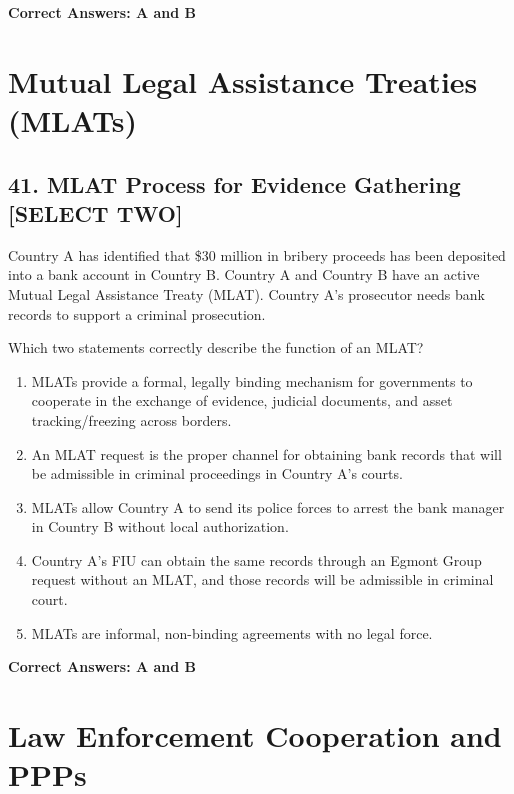\documentclass[11pt,a4paper]{article}
\begin{document}
	\textbf{Correct Answers: A and B}
	
	\section{Mutual Legal Assistance Treaties (MLATs)}
	
	\subsection{41. MLAT Process for Evidence Gathering \textnormal{[SELECT TWO]}}
	
	Country A has identified that \$30 million in bribery proceeds has been deposited into a bank account in Country B. Country A and Country B have an active Mutual Legal Assistance Treaty (MLAT). Country A's prosecutor needs bank records to support a criminal prosecution.
	
	Which two statements correctly describe the function of an MLAT?
	
	\begin{enumerate}[label=\Alph*.]
		\item MLATs provide a formal, legally binding mechanism for governments to cooperate in the exchange of evidence, judicial documents, and asset tracking/freezing across borders.
		\item An MLAT request is the proper channel for obtaining bank records that will be admissible in criminal proceedings in Country A's courts.
		\item MLATs allow Country A to send its police forces to arrest the bank manager in Country B without local authorization.
		\item Country A's FIU can obtain the same records through an Egmont Group request without an MLAT, and those records will be admissible in criminal court.
		\item MLATs are informal, non-binding agreements with no legal force.
	\end{enumerate}
	
	\textbf{Correct Answers: A and B}
	
	\section{Law Enforcement Cooperation and PPPs}
	
\end{document}
